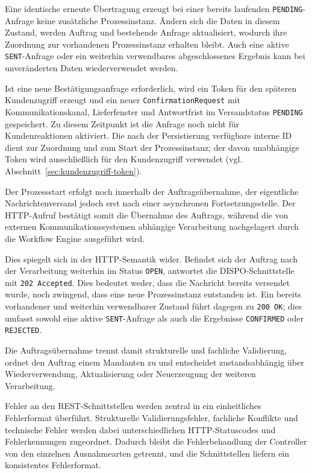 Eine identische erneute Übertragung erzeugt bei einer bereits laufenden
\texttt{PENDING}-Anfrage keine zusätzliche Prozessinstanz. Ändern sich die
Daten in diesem Zustand, werden Auftrag und bestehende Anfrage aktualisiert,
wodurch ihre Zuordnung zur vorhandenen Prozessinstanz erhalten bleibt. Auch
eine aktive \texttt{SENT}-Anfrage oder ein weiterhin verwendbares
abgeschlossenes Ergebnis kann bei unveränderten Daten wiederverwendet werden.

Ist eine neue Bestätigungsanfrage erforderlich, wird ein Token für den
späteren Kundenzugriff erzeugt und ein neuer \texttt{ConfirmationRequest} mit
Kommunikationskanal, Lieferfenster und Antwortfrist im Versandstatus
\texttt{PENDING} gespeichert. Zu diesem Zeitpunkt ist die Anfrage noch nicht
für Kundenreaktionen aktiviert. Die nach der Persistierung verfügbare interne
ID dient zur Zuordnung und zum Start der Prozessinstanz; der davon unabhängige
Token wird ausschließlich für den Kundenzugriff verwendet
(vgl. Abschnitt~\ref{sec:kundenzugriff-token}).

Der Prozessstart erfolgt noch innerhalb der Auftragsübernahme, der eigentliche
Nachrichtenversand jedoch erst nach einer asynchronen Fortsetzungsstelle. Der
HTTP-Aufruf bestätigt somit die Übernahme des Auftrags, während die von
externen Kommunikationssystemen abhängige Verarbeitung nachgelagert durch die
Workflow Engine ausgeführt wird.

Dies spiegelt sich in der HTTP-Semantik wider. Befindet sich der Auftrag nach
der Verarbeitung weiterhin im Status \texttt{OPEN}, antwortet die
DISPO-Schnittstelle mit \texttt{202 Accepted}. Dies bedeutet weder, dass die
Nachricht bereits versendet wurde, noch zwingend, dass eine neue
Prozessinstanz entstanden ist. Ein bereits vorhandener und weiterhin
verwendbarer Zustand führt dagegen zu \texttt{200 OK}; dies umfasst sowohl
eine aktive \texttt{SENT}-Anfrage als auch die Ergebnisse
\texttt{CONFIRMED} oder \texttt{REJECTED}.

Die Auftragsübernahme trennt damit strukturelle und fachliche Validierung,
ordnet den Auftrag einem Mandanten zu und entscheidet zustandsabhängig über
Wiederverwendung, Aktualisierung oder Neuerzeugung der weiteren Verarbeitung.

Fehler an den REST-Schnittstellen werden zentral in ein einheitliches
Fehlerformat überführt. Strukturelle Validierungsfehler, fachliche Konflikte und
technische Fehler werden dabei unterschiedlichen HTTP-Statuscodes und
Fehlerkennungen zugeordnet. Dadurch bleibt die Fehlerbehandlung der Controller
von den einzelnen Ausnahmearten getrennt, und die Schnittstellen liefern ein
konsistentes Fehlerformat.


